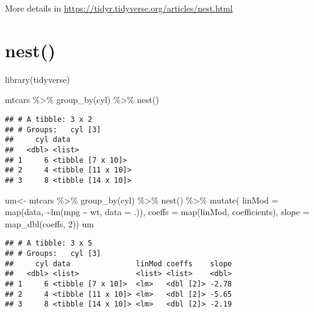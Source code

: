 \documentclass[
]{book}
\newenvironment{Shaded}{\begin{snugshade}}{\end{snugshade}}
\newcommand{\AttributeTok}[1]{\textcolor[rgb]{0.77,0.63,0.00}{#1}}
\newcommand{\DecValTok}[1]{\textcolor[rgb]{0.00,0.00,0.81}{#1}}
\newcommand{\FunctionTok}[1]{\textcolor[rgb]{0.00,0.00,0.00}{#1}}
\newcommand{\NormalTok}[1]{#1}
\newcommand{\OtherTok}[1]{\textcolor[rgb]{0.56,0.35,0.01}{#1}}
\newcommand{\SpecialCharTok}[1]{\textcolor[rgb]{0.00,0.00,0.00}{#1}}
\begin{document}
More details in \url{https://tidyr.tidyverse.org/articles/nest.html}

\hypertarget{nest}{%
\section{nest()}\label{nest}}

\begin{Shaded}
\begin{Highlighting}[]
\FunctionTok{library}\NormalTok{(tidyverse)}

\NormalTok{mtcars }\SpecialCharTok{\%\textgreater{}\%} 
  \FunctionTok{group\_by}\NormalTok{(cyl) }\SpecialCharTok{\%\textgreater{}\%} 
  \FunctionTok{nest}\NormalTok{() }
\end{Highlighting}
\end{Shaded}

\begin{verbatim}
## # A tibble: 3 x 2
## # Groups:   cyl [3]
##     cyl data              
##   <dbl> <list>            
## 1     6 <tibble [7 x 10]> 
## 2     4 <tibble [11 x 10]>
## 3     8 <tibble [14 x 10]>
\end{verbatim}

\begin{Shaded}
\begin{Highlighting}[]
\NormalTok{um}\OtherTok{\textless{}{-}}\NormalTok{ mtcars }\SpecialCharTok{\%\textgreater{}\%} 
  \FunctionTok{group\_by}\NormalTok{(cyl) }\SpecialCharTok{\%\textgreater{}\%} 
  \FunctionTok{nest}\NormalTok{() }\SpecialCharTok{\%\textgreater{}\%}
  \FunctionTok{mutate}\NormalTok{(}
    \AttributeTok{linMod =} \FunctionTok{map}\NormalTok{(data, }\SpecialCharTok{\textasciitilde{}}\FunctionTok{lm}\NormalTok{(mpg }\SpecialCharTok{\textasciitilde{}}\NormalTok{ wt, }\AttributeTok{data =}\NormalTok{ .)),}
    \AttributeTok{coeffs =} \FunctionTok{map}\NormalTok{(linMod, coefficients),}
    \AttributeTok{slope =} \FunctionTok{map\_dbl}\NormalTok{(coeffs, }\DecValTok{2}\NormalTok{))}
\NormalTok{um}
\end{Highlighting}
\end{Shaded}

\begin{verbatim}
## # A tibble: 3 x 5
## # Groups:   cyl [3]
##     cyl data               linMod coeffs    slope
##   <dbl> <list>             <list> <list>    <dbl>
## 1     6 <tibble [7 x 10]>  <lm>   <dbl [2]> -2.78
## 2     4 <tibble [11 x 10]> <lm>   <dbl [2]> -5.65
## 3     8 <tibble [14 x 10]> <lm>   <dbl [2]> -2.19
\end{verbatim}
\end{document}
